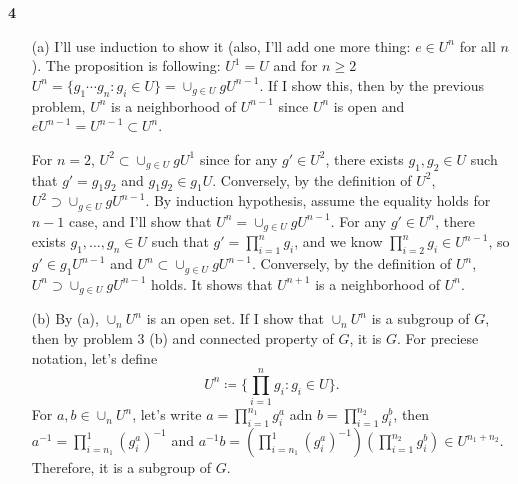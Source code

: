 \documentclass[a4paper, 12pt]{article}
\theoremstyle{Mydefinition}
\theoremstyle{Mytheorem}
\begin{document}
\noindent \textbf{4}
\begin{enumerate}
    \item[(a)] I'll use induction to show it (also, I'll add one more thing: $e\in U^n$ for all $n$). The proposition is following: $U^1= U$ and for $n\geq 2$ $U^n=\{g_1\cdots g_n:g_i\in U\} = \cup_{g\in U}gU^{n-1}$. If I show this, then by the previous problem, $U^n$ is a neighborhood of $U^{n-1}$ since $U^n$ is open and $eU^{n-1}=U^{n-1}\subset U^n$.
    
    For $n=2$, $U^2\subset \cup_{g\in U}gU^{1}$ since for any $g'\in U^2$, there exists $g_1,g_2\in U$ such that $g'=g_1g_2$ and $g_1g_2\in g_1U$. Conversely, by the definition of $U^2$, $U^2\supset \cup_{g\in U}gU^{n-1}$. By induction hypothesis, assume the equality holds for $n-1$ case, and I'll show that $U^n = \cup_{g\in U}gU^{n-1}$. For any $g'\in U^n$, there exists $g_1,\ldots, g_n\in U$ such that $g'=\prod_{i=1}^n g_i$, and we know $\prod_{i=2}^n g_i\in U^{n-1}$, so $g'\in g_1U^{n-1}$ and $U^{n}\subset \cup_{g\in U}gU^{n-1}$. Conversely, by the definition of $U^n$, $U^{n}\supset \cup_{g\in U}gU^{n-1}$ holds. It shows that $U^{n+1}$ is a neighborhood of $U^n$.
    
    \item[(b)] By (a), $\cup_n U^n$ is an open set. If I show that $\cup_{n} U^n$ is a subgroup of $G$, then by problem 3 (b) and connected property of $G$, it is $G$. For preciese notation, let's define
    \begin{equation*}
    U^n \coloneqq \{\prod_{i=1}^n g_i:g_i\in U\}.
    \end{equation*}
    For $a,b\in \cup_n U^n$, let's write $a = \prod_{i=1}^{n_1} g^a_i$ adn $b = \prod_{i=1}^{n_2}g^b_i$, then $a^{-1} = \prod_{i=n_1}^{1} (g^a_i)^{-1}$ and $a^{-1}b = \left(\prod_{i=n_1}^{1} (g^a_i)^{-1}\right)\left(\prod_{i=1}^{n_2}g^b_i\right)\in U^{n_1+n_2}$. Therefore, it is a subgroup of $G$.
\end{enumerate}



\end{document}
